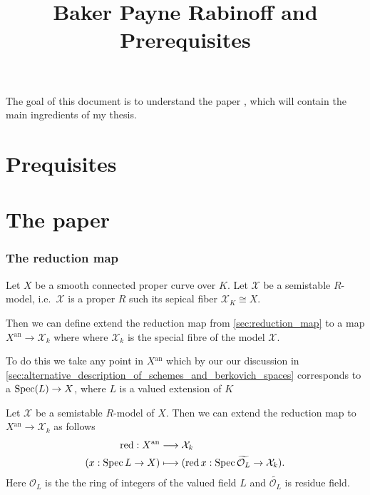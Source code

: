 \documentclass[a4paper]{article}
\title{Baker Payne Rabinoff and Prerequisites}
\newcommand{\an}{\ensuremath{{}^{\mathrm{an}}}}
\begin{document}
\maketitle

The goal of this document is to understand the paper \cite{bakerStructureNonarchimedeanAnalytic2013}, which will contain the main ingredients of my thesis.  

	
\mbox{}


\printnomenclature

\part{Prequisites}



\pagebreak

\part{The paper}

\section{The reduction map} \label{sec:the_reduction_map}
Let $X$ be a smooth connected proper curve over $K$. Let $\mathcal{X} $ be a semistable $R$-model, 
i.e.\ $\mathcal{X} $ is a proper $R$ such its sepical fiber $\mathcal{X}_K \cong X$.  

Then we can define extend the reduction map  from \cref{sec:reduction_map} to a map $X\an \to \mathcal{X} _k$ where where $\mathcal{X} _k$ is the special fibre of the model $\mathcal{X} $. 

To do this we take any point in $X\an$ which by our our discussion in \cref{sec:alternative_description_of_schemes_and_berkovich_spaces} corresponds to a  $\operatorname{Spec} (L) \to X$, where $L$ is a valued extension of $K$ 


\begin{definition}
	Let $\mathcal{X} $ be a semistable $R$-model of $X$. Then we can extend the reduction map to $X\an \to \mathcal{X} _k$ as follows 
	\begin{align*}
		\red: X\an &\longrightarrow  \mathcal{X} _k \\
		(x: \spec L \to X) &\longmapsto (\red x: \spec \widetilde{\mathcal{O}_L}  \to \mathcal{X} _k)
	.\end{align*}
	Here $\mathcal{O}_L$ is the the ring of integers of the valued field $L$ and $\widetilde{ \mathcal{O}_L} $ is residue field. 
\end{definition}
\end{document}
